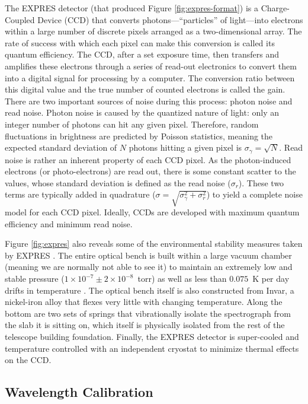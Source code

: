 The EXPRES detector (that produced Figure \ref{fig:expres-format}) is a Charge-Coupled Device (CCD) that converts photons---``particles'' of light---into electrons within a large number of discrete pixels arranged as a two-dimensional array. The rate of success with which each pixel can make this conversion is called its quantum efficiency. The CCD, after a set exposure time, then transfers and amplifies these electrons through a series of read-out electronics to convert them into a digital signal for processing by a computer. The conversion ratio between this digital value and the true number of counted electrons is called the gain. There are two important sources of noise during this process: photon noise and read noise. Photon noise is caused by the quantized nature of light: only an integer number of photons can hit any given pixel. Therefore, random fluctuations in brightness are predicted by Poisson statistics, meaning the expected standard deviation of $N$ photons hitting a given pixel is $\sigma_\gamma=\sqrt{N}$. Read noise is rather an inherent property of each CCD pixel. As the photon-induced electrons (or photo-electrons) are read out, there is some constant scatter to the values, whose standard deviation is defined as the read noise ($\sigma_r$). These two terms are typically added in quadrature ($\sigma=\sqrt{\sigma_\gamma^2 + \sigma_r^2}$) to yield a complete noise model for each CCD pixel. Ideally, CCDs are developed with maximum quantum efficiency and minimum read noise.

Figure \ref{fig:expres} also reveals some of the environmental stability measures taken by EXPRES \citep{jurgenson_expres_2016}. The entire optical bench is built within a large vacuum chamber (meaning we are normally not able to see it) to maintain an extremely low and stable pressure ($1\times 10^{-7} \pm 2\times 10^{-8}$~torr) as well as less than $0.075$~K per day drifts in temperature \citep{blackman_performance_2020}. The optical bench itself is also constructed from Invar, a nickel-iron alloy that flexes very little with changing temperature. Along the bottom are two sets of springs that vibrationally isolate the spectrograph from the slab it is sitting on, which itself is physically isolated from the rest of the telescope building foundation. Finally, the EXPRES detector is super-cooled and temperature controlled with an independent cryostat to minimize thermal effects on the CCD.

\subsection{Wavelength Calibration} \label{intro:wvln_cal}

